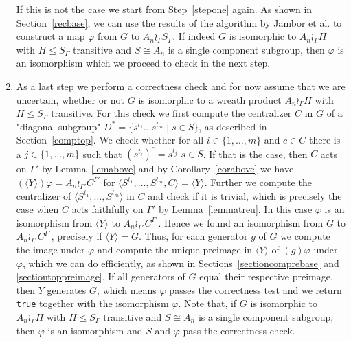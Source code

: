 \begin{enumerate}
If this is not the case we start from Step~\ref{stepone} again.
As shown in Section~\ref{recbase}, we can use the results of the algorithm by Jambor et al. %
to construct a map $\varphi$ from $G$ to $A_n \wr_\Gamma S_\Gamma$.
If indeed $G$ is isomorphic to $A_n \wr_\Gamma H$ with $H\leq S_\Gamma$ transitive and $S\cong A_n$ is a single component subgroup, then $\varphi$ is an isomorphism which we proceed to check in the next step.
\item \label{stepcorr}
\begin{sloppypar}
As a last step we perform a correctness check and for now assume that we are uncertain, whether or not $G$ is isomorphic to a wreath product $A_n \wr_\Gamma H$ with $H\leq S_\Gamma$ transitive.
For this check we first compute the centralizer $C$ in $G$ of a "diagonal subgroup" \mbox{$D^*=\{s^{t_1}\dots s^{t_m}\mid s\in S\}$}, as described in Section~\ref{comptop}.
We check whether for all $i\in \{1,\dots, m\}$ and $c\in C$ there is a $j\in \{1,\dots, m\}$ such that \mbox{$(s^{t_i})^c=s^{t_j}$} \fa $s \in S$.
If that is the case, then $C$ acts on $\Gamma'$ by Lemma~\ref{lemabove} and by Corollary~\ref{corabove} we have $(\langle Y\rangle)\varphi = A_n\wr_{\Gamma'} C^{\Gamma'}$ for $\langle S^{t_1}, \dots , S^{t_m}, C\rangle =\langle Y\rangle$.
Further we compute the centralizer of $\langle S^{t_1}, \dots , S^{t_m} \rangle$ in $C$ and check if it is trivial, which is precisely the case when $C$ acts faithfully on $\Gamma'$ by
Lemma~\ref{lemmatreu}.
In this case $\varphi$ is an isomorphism from $\langle Y \rangle$ to $A_n\wr_{\Gamma'} C^{\Gamma'}$.
Hence we found an isomorphism from $G$ to $A_n\wr_{\Gamma'} C^{\Gamma'}$, precisely if $\langle Y \rangle=G$.
Thus, for each generator $g$ of $G$ we compute the image under $\varphi$ and compute the unique preimage in $\langle Y \rangle$ of $(g)\varphi$ under $\varphi$,
which we can do efficiently, as shown in Sections~\ref{sectioncomprebase} and \ref{sectiontoppreimage}.
If all generators of $G$ equal their respective preimage, then $Y$ generates $G$, which means $\varphi$ passes the correctness test and we return \texttt{true} together with the isomorphism $\varphi$.
Note that, if $G$ is isomorphic to $A_n \wr_\Gamma H$ with $H\leq S_\Gamma$ transitive and $S\cong A_n$ is a single component subgroup, then $\varphi$ is an isomorphism and $S$ and $\varphi$ pass the correctness check.
\end{sloppypar}

% 
\end{enumerate}
